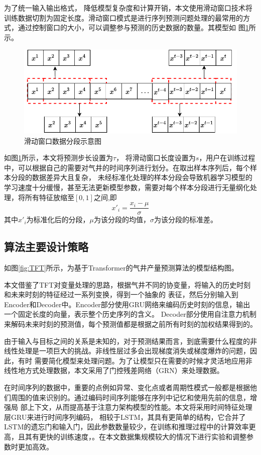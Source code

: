 为了统一输入输出格式，
降低模型复杂度和计算开销，本文使用滑动窗口技术将
训练数据切割为固定长度。滑动窗口模式是进行序列预测问题处理的最常用的方式，通过控制窗口的大小，可以调整参与预测的历史数据的数量。其模型如
图\ref{fig:slidewindow}所示。
\begin{figure}[H]
    \centering
    \includegraphics{figure/滑动窗口.vision.pdf}
    \caption{滑动窗口数据分段示意图}
    \label{fig:slidewindow}
\end{figure}
如图\ref{fig:slidewindow}所示，本文将预测步长设置为$\tau$， 将滑动窗口长度设置为$s$，用户在训练过程中，可以根据自己的需要对气井的时间序列进行划分。在取出样本序列后，每个样本分段的数据差异大且复杂，
未经标准化处理的样本分段会导致机器学习模型的学习速度十分缓慢，甚至无法更新模型参数，需要对每个样本分段进行无量纲化处理，将所有特征放缩至$[0,1]$之间,即
\begin{equation}
    x'_i = \frac{x_i - \mu}{\sigma}
\end{equation}
其中$x'_i$为标准化后的分段，$\mu$为该分段的均值，$\sigma$为该分段的标准差。
\subsection{算法主要设计策略}
如图\ref{fig:TFT}所示，为基于Transformer的气井产量预测算法的模型结构图。

本文借鉴了TFT对变量处理的思路，根据气井不同的协变量，将输入的历史时刻和未来时刻的特征经过一系列变换，得到一个抽象的
表征，然后分别输入到Encoder和Decoder中。Encoder部分使用GRU网络来编码历史时刻的信息，输出一个固定长度的向量，表示整个历史序列的含义。
Decoder部分使用自注意力机制来解码未来时刻的预测值，每个预测值都是根据之前所有时刻的加权结果得到的。

由于输入与目标之间的关系是未知的，对于预测结果而言，到底需要什么程度的非线性处理是一项巨大的挑战。非线性层过多会出现梯度消失或梯度爆炸的问题，因此，有时
需要简化模型来处理问题。为了让模型只在需要的时候才灵活地应用非线性地方式处理数据，本文采用了门控残差网络（GRN）来处理数据。

在时间序列的数据中，重要的点例如异常、变化点或者周期性模式一般都是根据他们周围的值来识别的。通过编码时间序列能够在序列中记忆和使用先前的信息，增强局
部上下文，从而提高基于注意力架构模型的性能。本文将采用时间特征处理层GRU来进行时间序列编码，
相较于LSTM，其具有更简单的结构，它合并了LSTM的遗忘门和输入门，因此参数数量较少，在训练和推理过程中的计算效率更高，且其有更快的训练速度，。在本文数据集规模较大的情况下进行实验和调整参数时更加高效。


